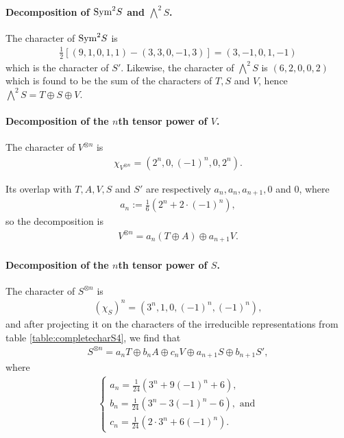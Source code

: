 
\paragraph{Decomposition of $\text{Sym}^2S$ and $\bigwedge^2S$.} The character of $\text{Sym}^2S$ is 
\begin{align}
	\frac{1}{2}\left[ (9,1,0,1,1)-(3,3,0,-1,3) \right] = (3,-1,0,1,-1)
\end{align}
which is the character of $S'$. Likewise, the character of $\bigwedge^2S$ is $(6,2,0,0,2)$ which is found to be the sum of the characters of $T, S$ and $V$, hence $\bigwedge^2S = T \oplus S \oplus V$.

\paragraph{Decomposition of the $n$th tensor power of $V$.}

The character of $V^{\otimes n}$ is
\begin{align}
	\chi_{V^{\otimes n}} = (2^n, 0, (-1)^n, 0, 2^n).
\end{align}

Its overlap with $T, A, V, S$ and $S'$ are respectively $a_n, a_n, a_{n+1}, 0$ and $0$, where 
\begin{align}
	a_n := \frac{1}{6}\left( 2^n + 2 \cdot (-1)^n \right),
\end{align}
so the decomposition is
\begin{align}
	V^{\otimes n} = a_n (T \oplus A) \oplus a_{n+1} V.
\end{align}

\paragraph{Decomposition of the $n$th tensor power of $S$.} The character of $S^{\otimes n}$ is 
\begin{align}
	(\chi_S)^n = (3^n, 1, 0, (-1)^n, (-1)^n),
\end{align}
and after projecting it on the characters of the irreducible representations from table \ref{table:completecharS4}, we find that
\begin{align}\label{eq:nthpowerS}
	S^{\otimes n} = a_n T \oplus b_n A \oplus c_n V \oplus a_{n+1} S \oplus b_{n+1} S',
\end{align}
where 
\begin{align}
	\begin{cases}
		a_n = \frac{1}{24}(3^n + 9(-1)^n+6), \\
		b_n = \frac{1}{24}(3^n - 3(-1)^n -6), \text{ and} \\
		c_n = \frac{1}{24}(2\cdot 3^n + 6(-1)^n).
	\end{cases}
\end{align}

